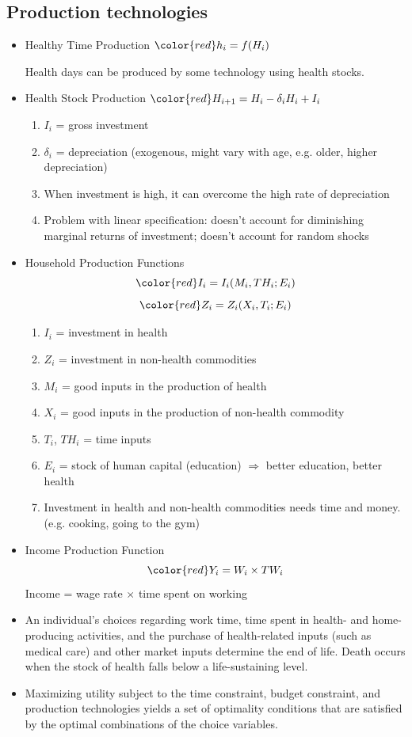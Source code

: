 \subsection{Production technologies}
\begin{itemize}
        \item Healthy Time Production $\color{red} h_i=f(H_i)$
        
        Health days can be produced by some technology using health stocks.
        
        \item Health Stock Production $\color{red} H_{i+1}=H_i-\delta_iH_i+I_i$
        \begin{enumerate}
        \item $I_i$ = gross investment
        \item $\delta_i$ = depreciation (exogenous, might vary with age, e.g. older, higher depreciation)
        \item When investment is high, it can overcome the high rate of depreciation
        \item Problem with linear specification: doesn't account for diminishing marginal returns of investment; doesn't account for random shocks
        \end{enumerate}
        \item Household Production Functions 
        $$\color{red} I_i=I_i(M_i,TH_i;E_i)$$
        $$\color{red} Z_i=Z_i(X_i,T_i;E_i)$$
        \begin{enumerate}
        \item $I_i$ = investment in health
        \item $Z_i$ = investment in non-health commodities
        \item $M_i$ = good inputs in the production of health
        \item $X_i$ = good inputs in the production of non-health commodity
        \item $T_i$, $TH_i$  = time inputs
        \item $E_i$ = stock of human capital (education) $\Rightarrow$ better education, better health
        \item Investment in health and non-health commodities needs time and money. (e.g. cooking, going to the gym) 
        \end{enumerate}
        \item Income Production Function
        $$\color{red}Y_i = W_i\times TW_i$$
        Income = wage rate $\times$ time spent on working    
        \item An individual’s choices regarding work time, time spent in health- and home-producing activities, and the purchase of health-related inputs (such as medical care) and other market inputs determine the end of life. Death occurs when the stock of health falls below a life-sustaining level.
        \item Maximizing utility subject to the time constraint, budget constraint, and production technologies yields a set of optimality conditions that are satisfied by the optimal combinations of the choice variables.
\end{itemize}     
        
